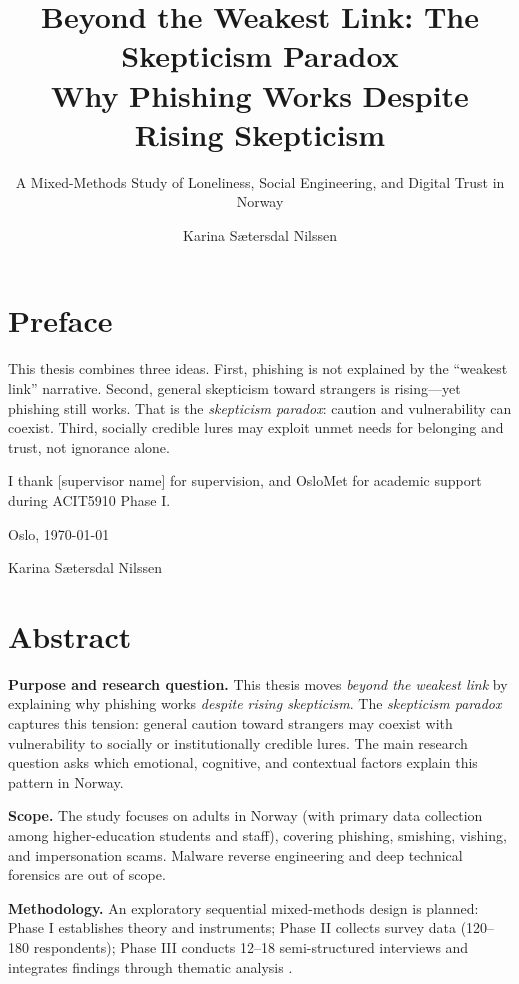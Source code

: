 \documentclass[UKenglish,12pt]{master-style}
\title{Beyond the Weakest Link: The Skepticism Paradox\\Why Phishing Works Despite Rising Skepticism}
\subtitle{A Mixed-Methods Study of Loneliness, Social Engineering, and Digital Trust in Norway}
\author{Karina Sætersdal Nilssen} %
\begin{document}
\duoforside[%
    dept={Department of Computer Science},
    program={Applied Computer and Information Technology (ACIT)},
    option={Cybersecurity},
    long
]

\frontmatter

\chapter*{Preface}

This thesis combines three ideas. First, phishing is not explained by the ``weakest link'' narrative. Second, general skepticism toward strangers is rising---yet phishing still works. That is the \emph{skepticism paradox}: caution and vulnerability can coexist. Third, socially credible lures may exploit unmet needs for belonging and trust, not ignorance alone.

I thank [supervisor name] for supervision, and OsloMet for academic support during ACIT5910 Phase I.

\vfill
\noindent Oslo, \today

\noindent Karina Sætersdal Nilssen

\chapter*{Abstract}

\textbf{Purpose and research question.} This thesis moves \emph{beyond the weakest link} by explaining why phishing works \emph{despite rising skepticism}. The \emph{skepticism paradox} captures this tension: general caution toward strangers may coexist with vulnerability to socially or institutionally credible lures. The main research question asks which emotional, cognitive, and contextual factors explain this pattern in Norway.

\textbf{Scope.} The study focuses on adults in Norway (with primary data collection among higher-education students and staff), covering phishing, smishing, vishing, and impersonation scams. Malware reverse engineering and deep technical forensics are out of scope.

\textbf{Methodology.} An exploratory sequential mixed-methods design is planned: Phase I establishes theory and instruments; Phase II collects survey data (120--180 respondents); Phase III conducts 12--18 semi-structured interviews and integrates findings through thematic analysis \parencite{braun2006thematic}.
\end{document}
